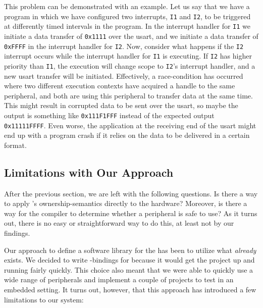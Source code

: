 This problem can be demonstrated with an example.
Let us say that we have a program in which we have configured two interrupts, \texttt{I1} and \texttt{I2}, to be triggered at differently timed intervals in the program.
In the interrupt handler for \texttt{I1} we initiate a data transfer of \texttt{0x1111} over the \gls{usart}, and we initiate a data transfer of \texttt{0xFFFF} in the interrupt handler for \texttt{I2}.
Now, consider what happens if the \texttt{I2} interrupt occurs while the interrupt handler for \texttt{I1} is executing.
If \texttt{I2} has higher priority than \texttt{I1}, the execution will change scope to \texttt{I2}'s interrupt handler, and a new \gls{usart} transfer will be initiated.
Effectively, a race-condition has occurred where two different execution contexts have acquired a handle to the same peripheral, and both are using this peripheral to transfer data at the same time.
This might result in corrupted data to be sent over the \gls{usart}, so maybe the output is something like \texttt{0x111F1FFF} instead of the expected output \texttt{0x11111FFFF}.
Even worse, the application at the receiving end of the \gls{usart} might end up with a program crash if it relies on the data to be delivered in a certain format.

\subsection{Limitations with Our Approach}

After the previous section, we are left with the following questions.
Is there a way to apply {\rust}'s ownership-semantics directly to the hardware?
Moreover, is there a way for the {\rust} compiler to determine whether a peripheral is safe to use?
As it turns out, there is no easy or straightforward way to do this, at least not by our findings.

Our approach to define a software library for the {\gecko} has been to utilize what \emph{already} exists.
We decided to write {\rust}-bindings for {\emlib} because it would get the project up and running fairly quickly.
This choice also meant that we were able to quickly use a wide range of peripherals and implement a couple of projects to test {\rust} in an embedded setting.
It turns out, however, that this approach has introduced a few limitations to our system:

